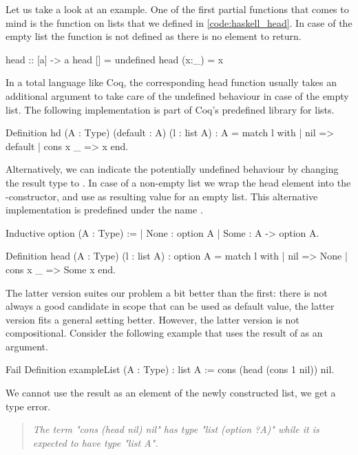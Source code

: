 Let us take a look at an example.
One of the first partial functions that comes to mind is the  function on lists that we defined in \autoref{code:haskell_head}.
In case of the empty list the function is not defined as there is no element to return.

\begin{haskellcode}
head :: [a] -> a
head []    = undefined
head (x:_) = x
\end{haskellcode}

In a total language like Coq, the corresponding head function usually takes an additional argument to take care of the undefined behaviour in case of the empty list.
The following implementation is part of Coq's predefined library for lists.

\begin{coqcode}
Definition hd (A : Type) (default : A) (l : list A) : A = 
  match l with
  | nil      => default
  | cons x _ => x
  end.
\end{coqcode}

Alternatively, we can indicate the potentially undefined behaviour by changing the result type to .
In case of a non\--empty list we wrap the head element into the \--constructor, and use  as resulting value for an empty list.
This alternative implementation is predefined under the name .

\begin{coqcode}
Inductive option (A : Type) :=
| None : option A
| Some : A -> option A.

Definition head (A : Type) (l : list A) : option A  = 
  match l with
  | nil    => None
  | cons x _ => Some x
  end.
\end{coqcode}

The latter version suites our problem a bit better than the first: there is not always a good candidate in scope that can be used as default value, the latter version fits a general setting better.
However, the latter version is not compositional.
Consider the following example that uses the result of  as an argument.

\begin{coqcode}
Fail Definition exampleList (A : Type) : list A :=
  cons (head (cons 1 nil)) nil.
\end{coqcode}

We cannot use the result as an element of the newly constructed list, we get a type error.

\begin{quote}
\emph{The term "cons (head nil) nil" has type "list (option ?A)" while it is expected to have type "list A".}
\end{quote}

